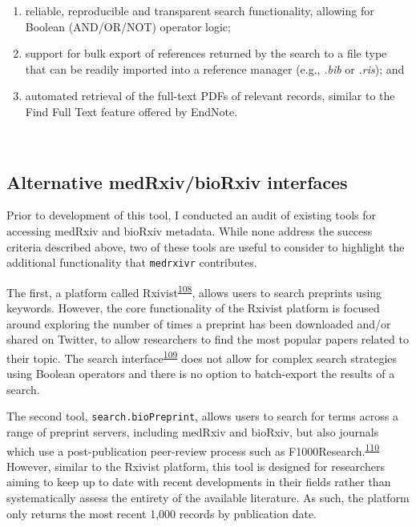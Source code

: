 \documentclass[a4paper, twoside]{templates/ociamthesis}
\begin{document}
\begin{enumerate}
\def\labelenumi{\arabic{enumi}.}
\item
  reliable, reproducible and transparent search functionality, allowing for Boolean (AND/OR/NOT) operator logic;
\item
  support for bulk export of references returned by the search to a file type that can be readily imported into a reference manager (e.g., \emph{.bib} or \emph{.ris}); and
\item
  automated retrieval of the full-text PDFs of relevant records, similar to the Find Full Text feature offered by EndNote.
\end{enumerate}

~

\hypertarget{alternative-medrxivbiorxiv-interfaces}{%
\subsection{Alternative medRxiv/bioRxiv interfaces}\label{alternative-medrxivbiorxiv-interfaces}}

Prior to development of this tool, I conducted an audit of existing tools for accessing medRxiv and bioRxiv metadata. While none address the success criteria described above, two of these tools are useful to consider to highlight the additional functionality that \texttt{medrxivr} contributes.

The first, a platform called Rxivist\textsuperscript{\protect\hyperlink{ref-abdill2019}{108}}, allows users to search preprints using keywords. However, the core functionality of the Rxivist platform is focused around exploring the number of times a preprint has been downloaded and/or shared on Twitter, to allow researchers to find the most popular papers related to their topic. The search interface\textsuperscript{\protect\hyperlink{ref-zotero-15027}{109}} does not allow for complex search strategies using Boolean operators and there is no option to batch-export the results of a search.

The second tool, \texttt{search.bioPreprint}, allows users to search for terms across a range of preprint servers, including medRxiv and bioRxiv, but also journals which use a post-publication peer-review process such as F1000Research.\textsuperscript{\protect\hyperlink{ref-iwema2016}{110}} However, similar to the Rxivist platform, this tool is designed for researchers aiming to keep up to date with recent developments in their fields rather than systematically assess the entirety of the available literature. As such, the platform only returns the most recent 1,000 records by publication date.
\end{document}
